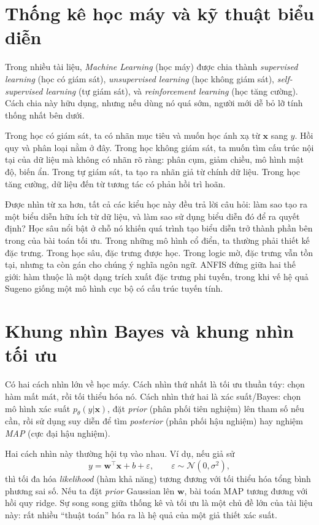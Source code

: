 \section{Thống kê học máy và kỹ thuật biểu diễn}

Trong nhiều tài liệu, \emph{Machine Learning} (học máy) được chia thành \emph{supervised learning} (học có giám sát), \emph{unsupervised learning} (học không giám sát), \emph{self-supervised learning} (tự giám sát), và \emph{reinforcement learning} (học tăng cường). Cách chia này hữu dụng, nhưng nếu dùng nó quá sớm, người mới dễ bỏ lỡ tính thống nhất bên dưới.

Trong học có giám sát, ta có nhãn mục tiêu và muốn học ánh xạ từ $\bm{x}$ sang $y$. Hồi quy và phân loại nằm ở đây. Trong học không giám sát, ta muốn tìm cấu trúc nội tại của dữ liệu mà không có nhãn rõ ràng: phân cụm, giảm chiều, mô hình mật độ, biến ẩn. Trong tự giám sát, ta tạo ra nhãn giả từ chính dữ liệu. Trong học tăng cường, dữ liệu đến từ tương tác có phản hồi trì hoãn.

Được nhìn từ xa hơn, tất cả các kiểu học này đều trả lời câu hỏi: làm sao tạo ra một biểu diễn hữu ích từ dữ liệu, và làm sao sử dụng biểu diễn đó để ra quyết định? Học sâu nổi bật ở chỗ nó khiến quá trình tạo biểu diễn trở thành phần bên trong của bài toán tối ưu. Trong những mô hình cổ điển, ta thường phải thiết kế đặc trưng. Trong học sâu, đặc trưng được học. Trong logic mờ, đặc trưng vẫn tồn tại, nhưng ta còn gán cho chúng ý nghĩa ngôn ngữ. ANFIS đứng giữa hai thế giới: hàm thuộc là một dạng trích xuất đặc trưng phi tuyến, trong khi vế hệ quả Sugeno giống một mô hình cục bộ có cấu trúc tuyến tính.

\section{Khung nhìn Bayes và khung nhìn tối ưu}

Có hai cách nhìn lớn về học máy. Cách nhìn thứ nhất là tối ưu thuần túy: chọn hàm mất mát, rồi tối thiểu hóa nó. Cách nhìn thứ hai là xác suất/Bayes: chọn mô hình xác suất $p_\theta(y|\bm{x})$, đặt \emph{prior} (phân phối tiên nghiệm) lên tham số nếu cần, rồi sử dụng suy diễn để tìm \emph{posterior} (phân phối hậu nghiệm) hay nghiệm \emph{MAP} (cực đại hậu nghiệm).

Hai cách nhìn này thường hội tụ vào nhau. Ví dụ, nếu giả sử
\[
y = \bm{w}^\top \bm{x} + b + \varepsilon,\qquad \varepsilon \sim \mathcal{N}(0,\sigma^2),
\]
thì tối đa hóa \emph{likelihood} (hàm khả năng) tương đương với tối thiểu hóa tổng bình phương sai số. Nếu ta đặt \emph{prior} Gaussian lên $\bm{w}$, bài toán MAP tương đương với hồi quy ridge. Sự song song giữa thống kê và tối ưu là một chủ đề lớn của tài liệu này: rất nhiều ``thuật toán'' hóa ra là hệ quả của một giả thiết xác suất.

